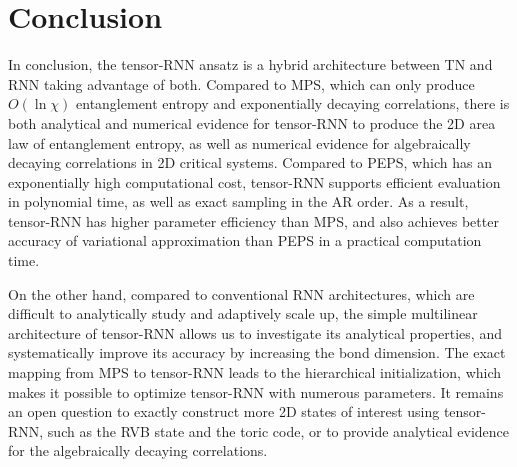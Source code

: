 \section{Conclusion}

In conclusion, the tensor-RNN ansatz is a hybrid architecture between TN and RNN taking advantage of both. Compared to MPS, which can only produce $O(\ln \chi)$ entanglement entropy and exponentially decaying correlations, there is both analytical and numerical evidence for tensor-RNN to produce the 2D area law of entanglement entropy, as well as numerical evidence for algebraically decaying correlations in 2D critical systems. Compared to PEPS, which has an exponentially high computational cost, tensor-RNN supports efficient evaluation in polynomial time, as well as exact sampling in the AR order. As a result, tensor-RNN has higher parameter efficiency than MPS, and also achieves better accuracy of variational approximation than PEPS in a practical computation time.

On the other hand, compared to conventional RNN architectures, which are difficult to analytically study and adaptively scale up, the simple multilinear architecture of tensor-RNN allows us to investigate its analytical properties, and systematically improve its accuracy by increasing the bond dimension. The exact mapping from MPS to tensor-RNN leads to the hierarchical initialization, which makes it possible to optimize tensor-RNN with numerous parameters. It remains an open question to exactly construct more 2D states of interest using tensor-RNN, such as the RVB state and the toric code, or to provide analytical evidence for the algebraically decaying correlations.
